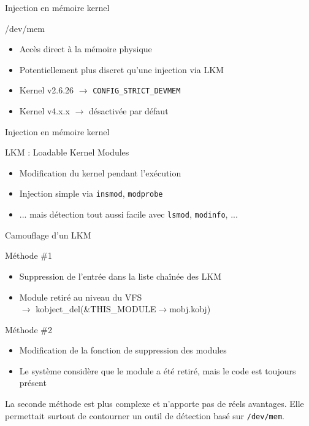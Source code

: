 \documentclass[10pt]{beamer}
\begin{document}
	\begin{frame}{Injection en mémoire kernel}
		\begin{alertblock}{/dev/mem}
	    \end{alertblock}
		\vspace{-0.60cm}
		\begin{itemize}
			\item Accès direct à la mémoire physique
			\item Potentiellement plus discret qu'une injection via LKM
			\item Kernel v2.6.26 $\rightarrow$ \texttt{CONFIG\_STRICT\_DEVMEM}
			\item Kernel v4.x.x $\rightarrow$ \alert{désactivée par défaut}
		\end{itemize}
	\end{frame}

	\begin{frame}{Injection en mémoire kernel}
		\begin{alertblock}{LKM : Loadable Kernel Modules}
	    \end{alertblock}
		\vspace{-0.60cm}
		\begin{itemize}
			\item Modification du kernel pendant l'exécution
			\item Injection simple via \alert{\texttt{insmod}}, \alert{\texttt{modprobe}}
			\item ... mais détection tout aussi facile avec \alert{\texttt{lsmod}}, \alert{\texttt{modinfo}}, ...
		\end{itemize}
	\end{frame}

	\begin{frame}{Camouflage d'un LKM}
		\begin{alertblock}{Méthode \#1}
	    \end{alertblock}
		\vspace{-0.60cm}
		\begin{itemize}
			\item Suppression de l'entrée dans la liste chaînée des LKM
			\item Module retiré au niveau du VFS \\
			$\rightarrow$ \alert{kobject\_del(\&THIS\_MODULE$\rightarrow$mobj.kobj)}
		\end{itemize}

		\begin{alertblock}{Méthode \#2}
	    \end{alertblock}
		\vspace{-0.60cm}
		\begin{itemize}
			\item Modification de la fonction de suppression des modules
			\item Le système considère que le module a été retiré, mais le code est toujours présent
		\end{itemize}

		\alert{La seconde méthode est plus complexe et n'apporte pas de réels avantages. Elle permettait surtout de contourner un outil de détection basé sur \texttt{/dev/mem}.}


	\end{frame}
\end{document}
